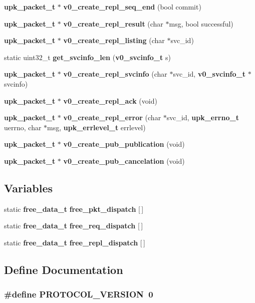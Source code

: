 \begin{DoxyCompactItemize}
\item 
{\bf upk\_\-packet\_\-t} $\ast$ {\bf v0\_\-create\_\-repl\_\-seq\_\-end} (bool commit)
\item 
{\bf upk\_\-packet\_\-t} $\ast$ {\bf v0\_\-create\_\-repl\_\-result} (char $\ast$msg, bool successful)
\item 
{\bf upk\_\-packet\_\-t} $\ast$ {\bf v0\_\-create\_\-repl\_\-listing} (char $\ast$svc\_\-id)
\item 
static uint32\_\-t {\bf get\_\-svcinfo\_\-len} ({\bf v0\_\-svcinfo\_\-t} s)
\item 
{\bf upk\_\-packet\_\-t} $\ast$ {\bf v0\_\-create\_\-repl\_\-svcinfo} (char $\ast$svc\_\-id, {\bf v0\_\-svcinfo\_\-t} $\ast$svcinfo)
\item 
{\bf upk\_\-packet\_\-t} $\ast$ {\bf v0\_\-create\_\-repl\_\-ack} (void)
\item 
{\bf upk\_\-packet\_\-t} $\ast$ {\bf v0\_\-create\_\-repl\_\-error} (char $\ast$svc\_\-id, {\bf upk\_\-errno\_\-t} uerrno, char $\ast$msg, {\bf upk\_\-errlevel\_\-t} errlevel)
\item 
{\bf upk\_\-packet\_\-t} $\ast$ {\bf v0\_\-create\_\-pub\_\-publication} (void)
\item 
{\bf upk\_\-packet\_\-t} $\ast$ {\bf v0\_\-create\_\-pub\_\-cancelation} (void)
\end{DoxyCompactItemize}
\subsection*{Variables}
\begin{DoxyCompactItemize}
\item 
static {\bf free\_\-data\_\-t} {\bf free\_\-pkt\_\-dispatch} [$\,$]
\item 
static {\bf free\_\-data\_\-t} {\bf free\_\-req\_\-dispatch} [$\,$]
\item 
static {\bf free\_\-data\_\-t} {\bf free\_\-repl\_\-dispatch} [$\,$]
\end{DoxyCompactItemize}


\subsection{Define Documentation}
\subsubsection[{PROTOCOL\_\-VERSION}]{\setlength{\rightskip}{0pt plus 5cm}\#define PROTOCOL\_\-VERSION~0}\label{upk__v0__protocol_8c_a277f7abca2044f354abe265252cb9252}
